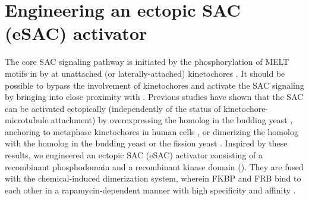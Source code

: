 \section{Engineering an ectopic SAC (eSAC) activator}
The core SAC signaling pathway is initiated by the phosphorylation of MELT motifs in  by  at unattached (or laterally-attached) kinetochores \cite{MPS1-KNL1_London2012, MPS1-KNL1_Shepperd2012, MPS1-KNL1_Yamagishi2012, GSK923295MonastrolCotreatment, GSK923295LateralAttachmentEM, LateralAttachmentSAC}. It should be possible to bypass the involvement of kinetochores and activate the SAC signaling by bringing  into close proximity with . Previous studies have shown that the SAC can be activated ectopically (independently of the status of kinetochore-microtubule attachment) by overexpressing the  homolog in the budding yeast \cite{Mps1pOverexpressionActivatesSAC}, anchoring  to metaphase kinetochores in human cells \cite{HeLa-A12_Ballister2014}, or dimerizing the  homolog with the  homolog in the budding yeast \cite{BuddingYeasteSAC} or the fission yeast \cite{FissionYeasteSAC}. Inspired by these results, we engineered an ectopic SAC (eSAC) activator consisting of a recombinant  phosphodomain and a recombinant  kinase domain (). They are fused with the chemical-induced dimerization system, wherein FKBP and FRB bind to each other in a rapamycin-dependent manner with high specificity and affinity \cite{FKBP-Rapamycin-FRB}.

